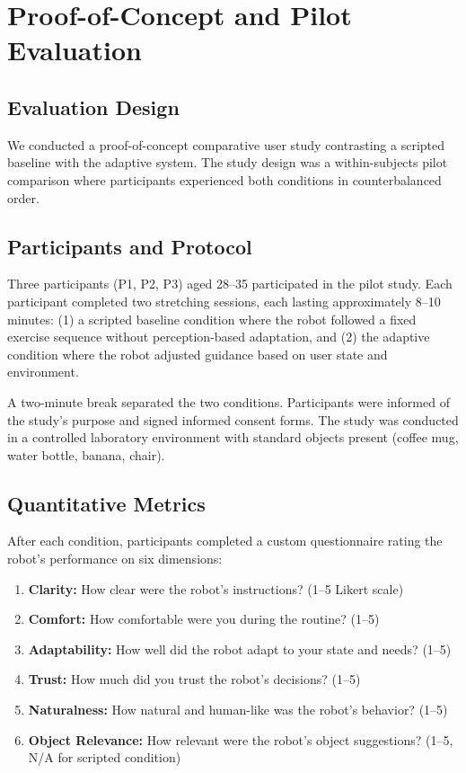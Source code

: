 \section{Proof-of-Concept and Pilot Evaluation}
\label{sec:evaluation}

\subsection{Evaluation Design}

We conducted a proof-of-concept comparative user study contrasting a scripted baseline with the adaptive system. The study design was a within-subjects pilot comparison where participants experienced both conditions in counterbalanced order.

\subsection{Participants and Protocol}

Three participants (P1, P2, P3) aged 28–35 participated in the pilot study. Each participant completed two stretching sessions, each lasting approximately 8–10 minutes: (1) a scripted baseline condition where the robot followed a fixed exercise sequence without perception-based adaptation, and (2) the adaptive condition where the robot adjusted guidance based on user state and environment.

A two-minute break separated the two conditions. Participants were informed of the study's purpose and signed informed consent forms. The study was conducted in a controlled laboratory environment with standard objects present (coffee mug, water bottle, banana, chair).

\subsection{Quantitative Metrics}

After each condition, participants completed a custom questionnaire rating the robot's performance on six dimensions:

\begin{enumerate}
\item \textbf{Clarity:} How clear were the robot's instructions? (1–5 Likert scale)
\item \textbf{Comfort:} How comfortable were you during the routine? (1–5)
\item \textbf{Adaptability:} How well did the robot adapt to your state and needs? (1–5)
\item \textbf{Trust:} How much did you trust the robot's decisions? (1–5)
\item \textbf{Naturalness:} How natural and human-like was the robot's behavior? (1–5)
\item \textbf{Object Relevance:} How relevant were the robot's object suggestions? (1–5, N/A for scripted condition)
\end{enumerate}

